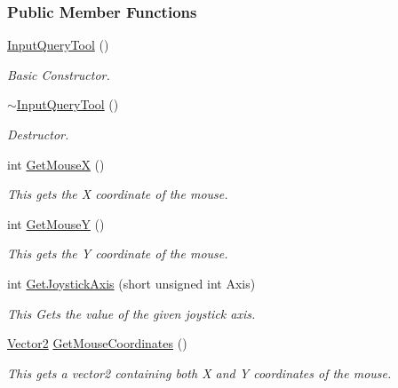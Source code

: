 \subsubsection*{Public Member Functions}
\begin{DoxyCompactItemize}
\item 
\hyperlink{classphys_1_1InputQueryTool_a10a997ec2e072d31808c794542c0516f}{InputQueryTool} ()
\begin{DoxyCompactList}\small\item\em Basic Constructor. \item\end{DoxyCompactList}\item 
\hyperlink{classphys_1_1InputQueryTool_a6a37616800928b691932045ba34759b8}{$\sim$InputQueryTool} ()
\begin{DoxyCompactList}\small\item\em Destructor. \item\end{DoxyCompactList}\item 
int \hyperlink{classphys_1_1InputQueryTool_a1df560487b85fcb90fd9294f3009eee6}{GetMouseX} ()
\begin{DoxyCompactList}\small\item\em This gets the X coordinate of the mouse. \item\end{DoxyCompactList}\item 
int \hyperlink{classphys_1_1InputQueryTool_a5cab535728ba864a83e7c374cc683d0b}{GetMouseY} ()
\begin{DoxyCompactList}\small\item\em This gets the Y coordinate of the mouse. \item\end{DoxyCompactList}\item 
int \hyperlink{classphys_1_1InputQueryTool_ae8b922315b271a2eeb376f10a7c97cf4}{GetJoystickAxis} (short unsigned int Axis)
\begin{DoxyCompactList}\small\item\em This Gets the value of the given joystick axis. \item\end{DoxyCompactList}\item 
\hyperlink{classphys_1_1Vector2}{Vector2} \hyperlink{classphys_1_1InputQueryTool_affd9523f67b542b208e6d36c3395e72b}{GetMouseCoordinates} ()
\begin{DoxyCompactList}\small\item\em This gets a vector2 containing both X and Y coordinates of the mouse. \item\end{DoxyCompactList}\item 

\end{DoxyCompactItemize}
